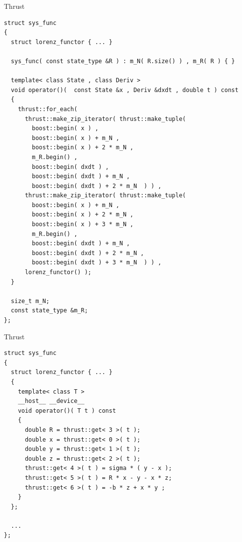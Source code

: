 \documentclass{beamer}
\newcommand{\heading}[1]{\centerline{\Large #1} \vspace{0.5em}}
\begin{document}
\begin{frame}[fragile]
 \heading{Thrust}


\begin{lstlisting}[basicstyle=\tiny\ttfamily]
struct sys_func
{
  struct lorenz_functor { ... }

  sys_func( const state_type &R ) : m_N( R.size() ) , m_R( R ) { }

  template< class State , class Deriv >
  void operator()(  const State &x , Deriv &dxdt , double t ) const
  {
    thrust::for_each(
      thrust::make_zip_iterator( thrust::make_tuple(
        boost::begin( x ) ,
        boost::begin( x ) + m_N ,
        boost::begin( x ) + 2 * m_N ,
        m_R.begin() ,
        boost::begin( dxdt ) ,
        boost::begin( dxdt ) + m_N ,
        boost::begin( dxdt ) + 2 * m_N  ) ) ,
      thrust::make_zip_iterator( thrust::make_tuple(
        boost::begin( x ) + m_N ,
        boost::begin( x ) + 2 * m_N ,
        boost::begin( x ) + 3 * m_N ,
        m_R.begin() ,
        boost::begin( dxdt ) + m_N ,
        boost::begin( dxdt ) + 2 * m_N ,
        boost::begin( dxdt ) + 3 * m_N  ) ) ,
      lorenz_functor() );
  }

  size_t m_N;
  const state_type &m_R;
};
\end{lstlisting}

\end{frame}



\begin{frame}[fragile]
 \heading{Thrust}


\begin{lstlisting}[basicstyle=\tiny\ttfamily]
struct sys_func
{
  struct lorenz_functor { ... }
  {
    template< class T >
    __host__ __device__
    void operator()( T t ) const
    {
      double R = thrust::get< 3 >( t );
      double x = thrust::get< 0 >( t );
      double y = thrust::get< 1 >( t );
      double z = thrust::get< 2 >( t );
      thrust::get< 4 >( t ) = sigma * ( y - x );
      thrust::get< 5 >( t ) = R * x - y - x * z;
      thrust::get< 6 >( t ) = -b * z + x * y ;
    }
  };

  ...
};
\end{lstlisting}

\end{frame}
\end{document}
